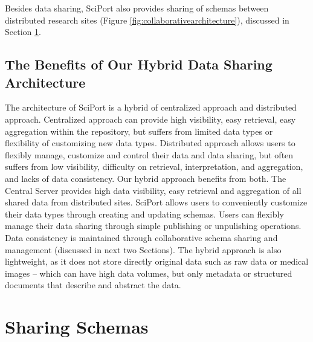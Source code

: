 \documentclass{singlecol-new}
\theoremstyle{TH}{
\newtheorem{lemma}{Lemma}
\newtheorem{theorem}[lemma]{Theorem}
\newtheorem{corrolary}[lemma]{Corrolary}
\newtheorem{conjecture}[lemma]{Conjecture}
\newtheorem{proposition}[lemma]{Proposition}
\newtheorem{claim}[lemma]{Claim}
\newtheorem{stheorem}[lemma]{Wrong Theorem}
\newtheorem{algorithm}{Algorithm}
}
\theoremstyle{THrm}{
\newtheorem{definition}{Definition}[section]
\newtheorem{question}{Question}[section]
\newtheorem{remark}{Remark}
\newtheorem{scheme}{Scheme}
}
\theoremstyle{THhit}{
\newtheorem{case}{Case}[section]
}
\begin{document}
\begin{figure*}[t]%
\caption{Sharing Data in Multiple Data Networks}
\label{fig:multiserverintegration}
\end{figure*}

Besides data sharing, SciPort also provides sharing of schemas
between distributed research sites (Figure
\ref{fig:collaborativearchitecture}), discussed in Section
\ref{sec:sharingschema}.

\begin{figure*}[t]%
\caption{Types of Information Sharing in SciPort}
\label{fig:collaborativearchitecture}
\end{figure*}

\subsection{The Benefits of Our Hybrid Data Sharing Architecture}

The architecture of SciPort is a hybrid of centralized approach and
distributed approach.  Centralized approach can provide high
visibility, easy retrieval, easy aggregation within the repository,
but suffers from limited data types or flexibility of customizing
new data types. Distributed approach allows users to flexibly
manage, customize and control their data and data sharing,  but
often suffers from low visibility, difficulty on retrieval,
interpretation, and aggregation, and lacks of data consistency. Our
hybrid approach benefits from both. The Central Server provides high
data visibility, easy retrieval and aggregation of all shared data
from distributed sites.   SciPort allows users to conveniently
customize their data types through creating and updating schemas.
Users can flexibly manage their data sharing through simple
publishing or unpulishing operations.  Data consistency is
maintained through collaborative schema sharing and management
(discussed in next two Sections). The hybrid approach is also
lightweight, as it does not store directly original data such as raw
data or medical images -- which can have high data volumes, but only
metadata or structured documents that describe and abstract the
data.


\section{Sharing Schemas} \label{sec:sharingschema}
\end{document}
